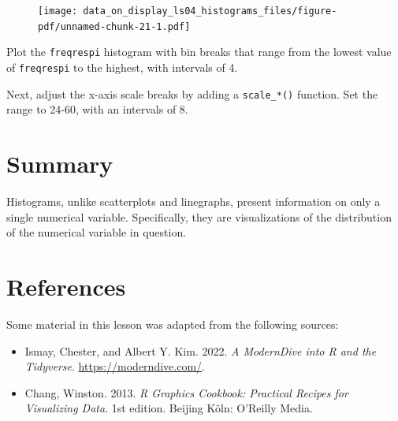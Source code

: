 \documentclass[
  letterpaper,
  DIV=11,
  numbers=noendperiod]{scrreprt}
\providecommand{\tightlist}{%
  \setlength{\itemsep}{0pt}\setlength{\parskip}{0pt}}\usepackage{longtable,booktabs,array}
\begin{document}
\begin{figure}[H]

{\centering \texttt{[image: data\_on\_display\_ls04\_histograms\_files/figure-pdf/unnamed-chunk-21-1.pdf]}

}

\end{figure}

\begin{tcolorbox}[enhanced jigsaw, colframe=quarto-callout-tip-color-frame, rightrule=.15mm, opacityback=0, breakable, coltitle=black, colbacktitle=quarto-callout-tip-color!10!white, bottomrule=.15mm, leftrule=.75mm, toprule=.15mm, arc=.35mm, bottomtitle=1mm, colback=white, left=2mm, opacitybacktitle=0.6, titlerule=0mm, title=\textcolor{quarto-callout-tip-color}{\faLightbulb}\hspace{0.5em}{Practice}, toptitle=1mm]

Plot the \texttt{freqrespi} histogram with bin breaks that range from
the lowest value of \texttt{freqrespi} to the highest, with intervals of
4.

Next, adjust the x-axis scale breaks by adding a \texttt{scale\_*()}
function. Set the range to 24-60, with an intervals of 8.

\end{tcolorbox}

\hypertarget{summary-1}{%
\section{Summary}\label{summary-1}}

Histograms, unlike scatterplots and linegraphs, present information on
only a single numerical variable. Specifically, they are visualizations
of the distribution of the numerical variable in question.

\hypertarget{references-16}{%
\section*{References}\label{references-16}}


Some material in this lesson was adapted from the following sources:

\begin{itemize}
\tightlist
\item
  Ismay, Chester, and Albert Y. Kim. 2022. \emph{A ModernDive into R and
  the Tidyverse}. \url{https://moderndive.com/}.
\item
  Chang, Winston. 2013. \emph{R Graphics Cookbook: Practical Recipes for
  Visualizing Data}. 1st edition. Beijing Köln: O'Reilly Media.
\end{itemize}
\end{document}
